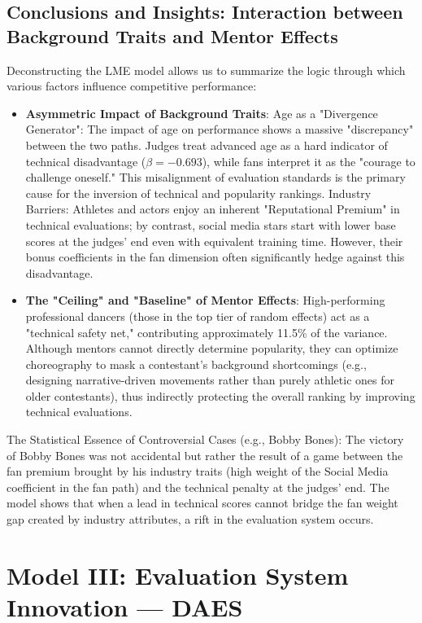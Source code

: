 \documentclass[12pt]{article}
\begin{document}
	\subsection{Conclusions and Insights: Interaction between Background Traits and Mentor Effects}
	Deconstructing the LME model allows us to summarize the logic through which various factors influence competitive performance:
	\begin{itemize}
		\item \textbf{Asymmetric Impact of Background Traits}:
		Age as a "Divergence Generator": The impact of age on performance shows a massive "discrepancy" between the two paths. Judges treat advanced age as a hard indicator of technical disadvantage ($\beta = -0.693$), while fans interpret it as the "courage to challenge oneself." This misalignment of evaluation standards is the primary cause for the inversion of technical and popularity rankings.
		Industry Barriers: Athletes and actors enjoy an inherent "Reputational Premium" in technical evaluations; by contrast, social media stars start with lower base scores at the judges' end even with equivalent training time. However, their bonus coefficients in the fan dimension often significantly hedge against this disadvantage.
		\item \textbf{The "Ceiling" and "Baseline" of Mentor Effects}:
		High-performing professional dancers (those in the top tier of random effects) act as a "technical safety net," contributing approximately 11.5\% of the variance.
		Although mentors cannot directly determine popularity, they can optimize choreography to mask a contestant's background shortcomings (e.g., designing narrative-driven movements rather than purely athletic ones for older contestants), thus indirectly protecting the overall ranking by improving technical evaluations.
	\end{itemize}
	The Statistical Essence of Controversial Cases (e.g., Bobby Bones): The victory of Bobby Bones was not accidental but rather the result of a game between the fan premium brought by his industry traits (high weight of the Social Media coefficient in the fan path) and the technical penalty at the judges' end. The model shows that when a lead in technical scores cannot bridge the fan weight gap created by industry attributes, a rift in the evaluation system occurs.
	
	\section{Model III: Evaluation System Innovation — DAES}
\end{document}
